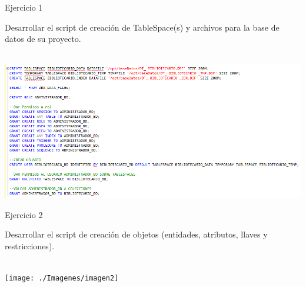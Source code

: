 \begin{itemize}
	\begin{center}
	    Ejercicio 1
	\end{center}
	

	    Desarrollar el script de creación de TableSpace(s) y archivos para la base de datos de su proyecto.\\\\
	    
	    
	    
		\begin{center}
		\includegraphics[width=15cm]{./Imagenes/imagen1} 
		\end{center}
	

	\end{itemize} 
	

	\begin{itemize}
	\begin{center}
	    Ejercicio 2
	\end{center}
	

	    Desarrollar el script de creación de objetos (entidades, atributos, llaves y restricciones). \\\\
		\begin{center}
		\texttt{[image: ./Imagenes/imagen2]} 
		\end{center}
	

	\end{itemize} 
	

  
  
  


